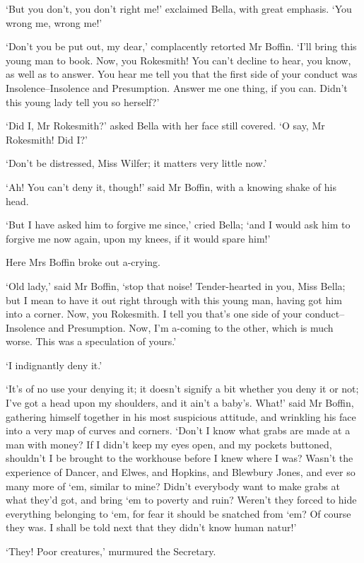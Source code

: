 ‘But you don’t, you don’t right me!’ exclaimed Bella, with great
emphasis. ‘You wrong me, wrong me!’

‘Don’t you be put out, my dear,’ complacently retorted Mr Boffin. ‘I’ll
bring this young man to book. Now, you Rokesmith! You can’t decline
to hear, you know, as well as to answer. You hear me tell you that the
first side of your conduct was Insolence--Insolence and Presumption.
Answer me one thing, if you can. Didn’t this young lady tell you so
herself?’

‘Did I, Mr Rokesmith?’ asked Bella with her face still covered. ‘O say,
Mr Rokesmith! Did I?’

‘Don’t be distressed, Miss Wilfer; it matters very little now.’

‘Ah! You can’t deny it, though!’ said Mr Boffin, with a knowing shake of
his head.

‘But I have asked him to forgive me since,’ cried Bella; ‘and I would
ask him to forgive me now again, upon my knees, if it would spare him!’

Here Mrs Boffin broke out a-crying.

‘Old lady,’ said Mr Boffin, ‘stop that noise! Tender-hearted in you,
Miss Bella; but I mean to have it out right through with this young man,
having got him into a corner. Now, you Rokesmith. I tell you that’s one
side of your conduct--Insolence and Presumption. Now, I’m a-coming to
the other, which is much worse. This was a speculation of yours.’

‘I indignantly deny it.’

‘It’s of no use your denying it; it doesn’t signify a bit whether
you deny it or not; I’ve got a head upon my shoulders, and it ain’t a
baby’s. What!’ said Mr Boffin, gathering himself together in his most
suspicious attitude, and wrinkling his face into a very map of curves
and corners. ‘Don’t I know what grabs are made at a man with money? If
I didn’t keep my eyes open, and my pockets buttoned, shouldn’t I
be brought to the workhouse before I knew where I was? Wasn’t the
experience of Dancer, and Elwes, and Hopkins, and Blewbury Jones, and
ever so many more of ‘em, similar to mine? Didn’t everybody want to make
grabs at what they’d got, and bring ‘em to poverty and ruin? Weren’t
they forced to hide everything belonging to ‘em, for fear it should be
snatched from ‘em? Of course they was. I shall be told next that they
didn’t know human natur!’

‘They! Poor creatures,’ murmured the Secretary.

